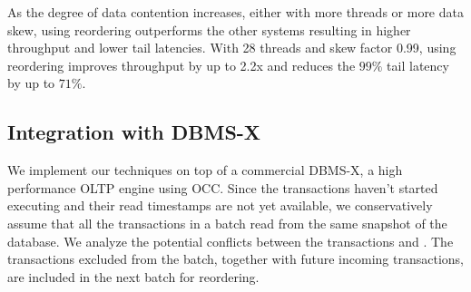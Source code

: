As the degree of data contention increases, either with more threads or more data skew, using reordering outperforms the other systems resulting in higher throughput and lower tail latencies. With 28 threads and skew factor 0.99, using reordering improves throughput by up to 2.2x and reduces the $99\%$ tail latency by up to $71\%$.



\subsection{Integration with DBMS-X}
\label{subsec:experiment:compare}

We implement our techniques on top of a commercial DBMS-X, a high performance OLTP engine using OCC.
 Since the transactions haven't started executing and their read timestamps are not yet available, we conservatively assume that all the transactions in a batch read from the same snapshot of the database. We analyze the potential conflicts between the transactions and . The transactions excluded from the batch, together with future incoming transactions, are included in the next batch for reordering.

